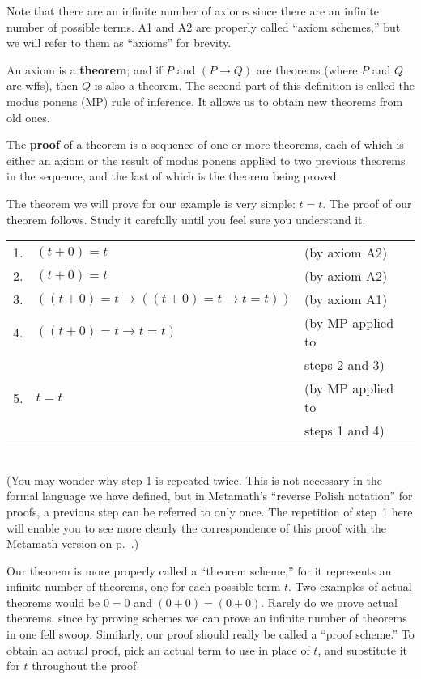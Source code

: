 Note that there are an infinite number of axioms since there are an infinite
number of possible terms.  A1 and A2 are properly called ``axiom
schemes,'' but we will refer to them as ``axioms'' for
brevity.

An axiom is a {\bf theorem}; and if $P$ and $(P\rightarrow Q)$ are theorems
(where $P$ and $Q$ are wffs), then $Q$ is also a theorem.  The
second part of this definition is called the modus ponens (MP) rule of
inference.  It allows us to obtain
new theorems from old ones.

The {\bf proof} of a theorem is a sequence of one or more
theorems, each of which is either an axiom or the result of modus ponens
applied to two previous theorems in the sequence, and the last of which is the
theorem being proved.

The theorem we will prove for our example is very simple:  $ t=t$.  The proof of
our theorem follows.  Study it carefully until you feel sure you
understand it.\label{zeroproof}
\\[\baselineskip]
\begin{tabular}{lll}
1.&$(t+0)=t$&(by axiom A2)\\
2.&$(t+0)=t$&(by axiom A2)\\
3.&$((t+0)=t\rightarrow ((t+0)=t\rightarrow t=t))$&(by axiom A1)\\
4.&$((t+0)=t\rightarrow t=t)$&(by MP applied to\\
{}&{}&steps 2 and 3)\\
5.&$ t=t$&(by MP applied to\\
{}&{}&steps 1 and 4)
\end{tabular}
\\[\baselineskip]
(You may wonder why step 1 is repeated twice.  This is not necessary in the
formal language we have defined, but in Metamath's ``reverse Polish
notation'' for proofs, a previous step
can be referred to only once.  The repetition of step~1 here will enable you
to see more clearly the correspondence of this proof with the
Metamath version on p.~\pageref{demoproof}.)

Our theorem is more properly called a ``theorem scheme,'' for it represents an infinite number of theorems, one for each
possible term $ t$.  Two examples of actual theorems would be $0=0$ and
$(0+0)=(0+0)$.  Rarely do we prove actual theorems, since by proving schemes
we can prove an infinite number of theorems in one fell swoop.  Similarly, our
proof should really be called a ``proof scheme.''  To
obtain an actual proof, pick an actual term to use in place of $ t$, and
substitute it for $ t$ throughout the proof.

